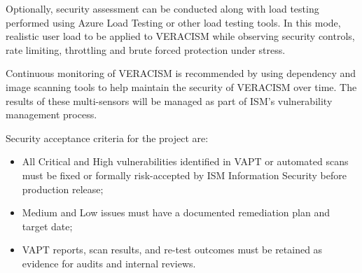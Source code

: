 Optionally, security assessment can be conducted along with load testing performed using Azure Load Testing or other load testing tools. In this mode, realistic user load to be applied to VERACISM while observing security controls, rate limiting, throttling and brute forced protection under stress.

Continuous monitoring of VERACISM is recommended by using dependency and image scanning tools to help maintain the security of VERACISM over time. The results of these multi-sensors will be managed as part of ISM's vulnerability management process.

Security acceptance criteria for the project are:

\begin{itemize}
  \item All Critical and High vulnerabilities identified in VAPT or automated
        scans must be fixed or formally risk-accepted by ISM Information
        Security before production release;
  \item Medium and Low issues must have a documented remediation plan and
        target date;
  \item VAPT reports, scan results, and re-test outcomes must be retained as
        evidence for audits and internal reviews.
\end{itemize}
